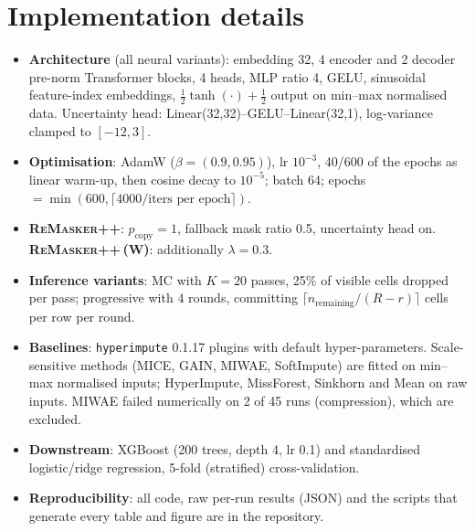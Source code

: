 \documentclass[11pt]{article}
\newcommand{\rmpp}{\textsc{ReMasker++}}
\begin{document}
\section{Implementation details}
\begin{itemize}
\item \textbf{Architecture} (all neural variants): embedding 32, 4 encoder and 2 decoder pre-norm Transformer blocks, 4 heads, MLP ratio 4, GELU, sinusoidal feature-index embeddings, $\tfrac12\tanh(\cdot)+\tfrac12$ output on min--max normalised data. Uncertainty head: Linear(32,32)--GELU--Linear(32,1), log-variance clamped to $[-12,3]$.
\item \textbf{Optimisation}: AdamW ($\beta=(0.9,0.95)$), lr $10^{-3}$, 40/600 of the epochs as linear warm-up, then cosine decay to $10^{-5}$; batch 64; epochs $=\min(600,\lceil 4000/\text{iters per epoch}\rceil)$.
\item \textbf{\rmpp}: $p_{\text{copy}}=1$, fallback mask ratio 0.5, uncertainty head on. \textbf{\rmpp{}\,(W)}: additionally $\lambda=0.3$.
\item \textbf{Inference variants}: MC with $K=20$ passes, 25\% of visible cells dropped per pass; progressive with 4 rounds, committing $\lceil n_{\text{remaining}}/(R-r)\rceil$ cells per row per round.
\item \textbf{Baselines}: \texttt{hyperimpute} 0.1.17 plugins with default hyper-parameters. Scale-sensitive methods (MICE, GAIN, MIWAE, SoftImpute) are fitted on min--max normalised inputs; HyperImpute, MissForest, Sinkhorn and Mean on raw inputs. MIWAE failed numerically on 2 of 45 runs (compression), which are excluded.
\item \textbf{Downstream}: XGBoost (200 trees, depth 4, lr 0.1) and standardised logistic/ridge regression, 5-fold (stratified) cross-validation.
\item \textbf{Reproducibility}: all code, raw per-run results (JSON) and the scripts that generate every table and figure are in the repository.
\end{itemize}
\end{document}
